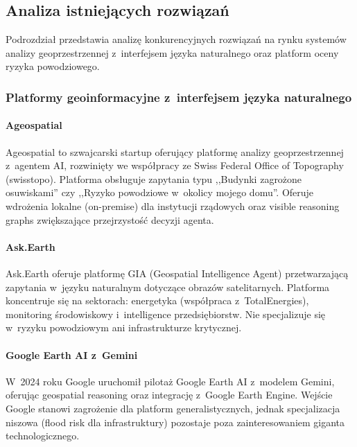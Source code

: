 \subsection{Analiza istniejących rozwiązań}

Podrozdział przedstawia analizę konkurencyjnych rozwiązań na rynku systemów analizy geoprzestrzennej z~interfejsem języka naturalnego oraz platform oceny ryzyka powodziowego.

\subsubsection{Platformy geoinformacyjne z~interfejsem języka naturalnego}

\paragraph{Ageospatial}

Ageospatial to szwajcarski startup oferujący platformę analizy geoprzestrzennej z~agentem AI, rozwinięty we współpracy ze Swiss Federal Office of Topography (swisstopo). Platforma obsługuje zapytania typu ,,Budynki zagrożone osuwiskami'' czy ,,Ryzyko powodziowe w~okolicy mojego domu''. Oferuje wdrożenia lokalne (on-premise) dla instytucji rządowych oraz visible reasoning graphs zwiększające przejrzystość decyzji agenta.

\paragraph{Ask.Earth}

Ask.Earth oferuje platformę GIA (Geospatial Intelligence Agent) przetwarzającą zapytania w~języku naturalnym dotyczące obrazów satelitarnych. Platforma koncentruje się na sektorach: energetyka (współpraca z~TotalEnergies), monitoring środowiskowy i~intelligence przedsiębiorstw. Nie specjalizuje się w~ryzyku powodziowym ani infrastrukturze krytycznej.

\paragraph{Google Earth AI z~Gemini}

W~2024 roku Google uruchomił pilotaż Google Earth AI z~modelem Gemini, oferując geospatial reasoning oraz integrację z~Google Earth Engine. Wejście Google stanowi zagrożenie dla platform generalistycznych, jednak specjalizacja niszowa (flood risk dla infrastruktury) pozostaje poza zainteresowaniem giganta technologicznego.

